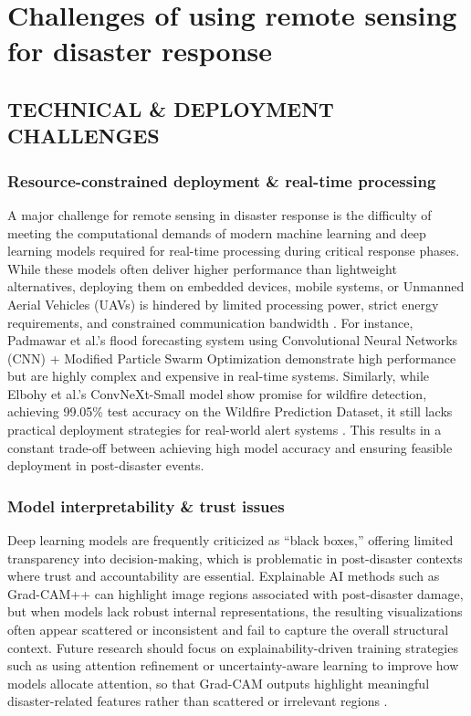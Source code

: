 \documentclass[conference,a4paper]{IEEEtran}
\begin{document}
\section{Challenges of using remote sensing for disaster response}


\subsection{TECHNICAL \& DEPLOYMENT CHALLENGES}


\subsubsection{\textbf{Resource-constrained deployment \& real-time processing}}
A major challenge for remote sensing in disaster response is the difficulty of meeting the computational demands of modern machine learning and deep learning models required for real-time processing during critical response phases. While these models often deliver higher performance than lightweight alternatives, deploying them on embedded devices, mobile systems, or Unmanned Aerial Vehicles (UAVs) is hindered by limited processing power, strict energy requirements, and constrained communication bandwidth \cite{elbohy2025fusion}. For instance, Padmawar et al.'s flood forecasting system using Convolutional Neural Networks (CNN) + Modified Particle Swarm Optimization demonstrate high performance but are highly complex and expensive in real-time systems. Similarly, while Elbohy et al.'s ConvNeXt-Small model show promise for wildfire detection, achieving 99.05\% test accuracy on the Wildfire Prediction Dataset, it still lacks practical deployment strategies for real-world alert systems \cite{elbohy2025fusion}. This results in a constant trade-off between achieving high model accuracy and ensuring feasible deployment in post-disaster events.

\subsubsection{\textbf{Model interpretability \& trust issues}}
Deep learning models are frequently criticized as ``black boxes,'' offering limited transparency into decision-making, which is problematic in post-disaster contexts where trust and accountability are essential. Explainable AI methods such as Grad-CAM++ can highlight image regions associated with post-disaster damage, but when models lack robust internal representations, the resulting visualizations often appear scattered or inconsistent and fail to capture the overall structural context. Future research should focus on explainability-driven training strategies such as using attention refinement or uncertainty-aware learning to improve how models allocate attention, so that Grad-CAM outputs highlight meaningful disaster-related features rather than scattered or irrelevant regions \cite{lagapEnhancingPostDisasterDamage2025}.
\end{document}
